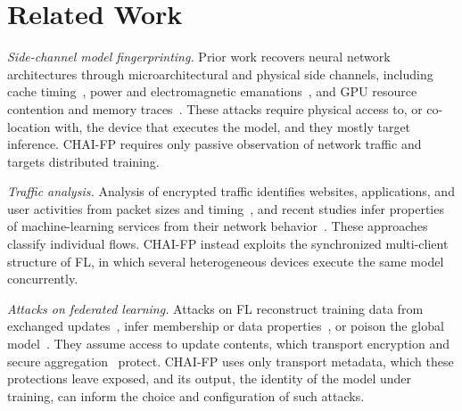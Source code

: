 \section{Related Work}
\label{sec:related}
\emph{Side-channel model fingerprinting.} Prior work recovers neural network
architectures through microarchitectural and physical side channels, including
cache timing~\cite{TODO-cache-side-channel}, power and electromagnetic
emanations~\cite{TODO-power-em}, and GPU resource contention and memory
traces~\cite{TODO-gpu-side-channel}. These attacks require physical access to,
or co-location with, the device that executes the model, and they mostly target
inference. CHAI-FP requires only passive observation of network traffic and
targets distributed training.

\emph{Traffic analysis.} Analysis of encrypted traffic identifies websites,
applications, and user activities from packet sizes and timing~\cite{TODO-traffic-analysis},
and recent studies infer properties of machine-learning services from their
network behavior~\cite{TODO-ml-service-traffic}. These approaches classify
individual flows. CHAI-FP instead exploits the synchronized multi-client
structure of FL, in which several heterogeneous devices execute the same model
concurrently.

\emph{Attacks on federated learning.} Attacks on FL reconstruct training data
from exchanged updates~\cite{TODO-gradient-inversion}, infer membership or data
properties~\cite{TODO-fl-inference}, or poison the global
model~\cite{TODO-fl-poisoning}. They assume access to update contents, which
transport encryption and secure aggregation~\cite{TODO-secure-aggregation}
protect. CHAI-FP uses only transport metadata, which these protections leave
exposed, and its output, the identity of the model under training, can inform
the choice and configuration of such attacks.
